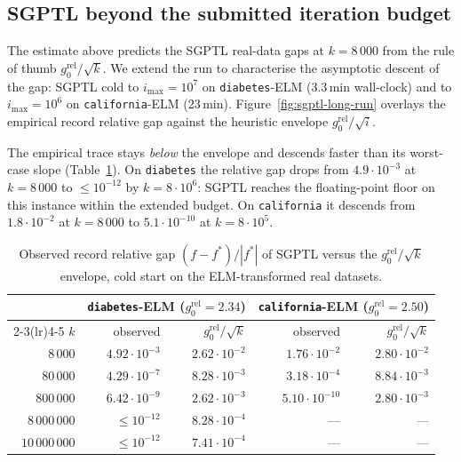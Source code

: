 \subsection{SGPTL beyond the submitted iteration budget}
\label{sec:dsm_long_run}
The estimate above predicts the SGPTL real-data gaps at $k=8\,000$ from
the rule of thumb $g_{0}^{\mathrm{rel}}/\sqrt{k}$. We extend the run to
characterise the asymptotic descent of the gap: SGPTL cold to
$i_{\max}=10^{7}$ on \texttt{diabetes}-ELM ($3.3$\,min wall-clock) and to
$i_{\max}=10^{6}$ on \texttt{california}-ELM ($23$\,min).
Figure~\ref{fig:sgptl-long-run} overlays the empirical record relative
gap against the heuristic envelope $g_{0}^{\mathrm{rel}}/\sqrt{i}$.

The empirical trace stays \emph{below} the envelope and descends faster
than its worst-case slope (Table~\ref{tab:sgptl-long-run-samples}). On
\texttt{diabetes} the relative gap drops from $4.9\cdot 10^{-3}$ at
$k=8\,000$ to $\le 10^{-12}$ by $k=8\cdot 10^{6}$: SGPTL reaches the
floating-point floor on this instance within the extended budget. On
\texttt{california} it descends from $1.8\cdot 10^{-2}$ at $k=8\,000$ to
$5.1\cdot 10^{-10}$ at $k=8\cdot 10^{5}$.

\begin{table}[H]
    \centering
    \small
    \setlength{\tabcolsep}{8pt}
    \begin{tabular}{rrrrr}
        \toprule
        & \multicolumn{2}{c}{\texttt{diabetes}-ELM ($g_{0}^{\mathrm{rel}}=2.34$)} & \multicolumn{2}{c}{\texttt{california}-ELM ($g_{0}^{\mathrm{rel}}=2.50$)} \\
        \cmidrule(lr){2-3}\cmidrule(lr){4-5}
        $k$ & observed & $g_{0}^{\mathrm{rel}}/\sqrt{k}$ & observed & $g_{0}^{\mathrm{rel}}/\sqrt{k}$ \\
        \midrule
        $8\,000$         & $4.92\cdot 10^{-3}$ & $2.62\cdot 10^{-2}$ & $1.76\cdot 10^{-2}$  & $2.80\cdot 10^{-2}$ \\
        $80\,000$        & $4.29\cdot 10^{-7}$ & $8.28\cdot 10^{-3}$ & $3.18\cdot 10^{-4}$  & $8.84\cdot 10^{-3}$ \\
        $800\,000$       & $6.42\cdot 10^{-9}$ & $2.62\cdot 10^{-3}$ & $5.10\cdot 10^{-10}$ & $2.80\cdot 10^{-3}$ \\
        $8\,000\,000$    & ${\le}10^{-12}$     & $8.28\cdot 10^{-4}$ & ---                  & --- \\
        $10\,000\,000$   & ${\le}10^{-12}$     & $7.41\cdot 10^{-4}$ & ---                  & --- \\
        \bottomrule
    \end{tabular}
    \caption{Observed record relative gap $(f-f^{*})/|f^{*}|$ of SGPTL
    versus the $g_{0}^{\mathrm{rel}}/\sqrt{k}$ envelope, cold start on the
    ELM-transformed real datasets.}
    \label{tab:sgptl-long-run-samples}
\end{table}

